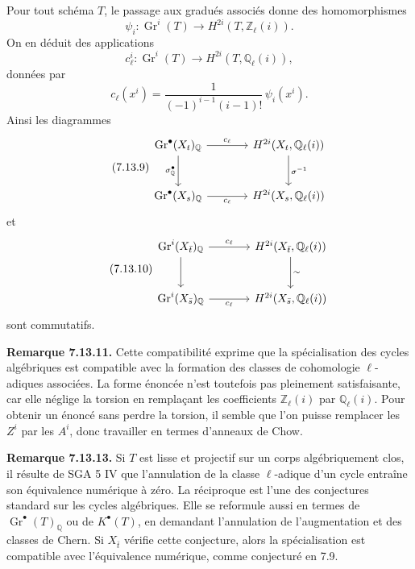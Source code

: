 \documentclass[11pt]{article}
\newcommand{\Gr}{\operatorname{Gr}}
\providecommand{\Gr}{\operatorname{Gr}}
\providecommand{\Gr}{\operatorname{G}}
\begin{document}
Pour tout schéma \(T\), le passage aux gradués associés donne des homomorphismes
\[
  \psi_i:\Gr^i(T)\longrightarrow H^{2i}(T,\mathbb Z_\ell(i)).
\]
On en déduit des applications
\begin{equation}\tag{7.13.7}
  c_\ell^i:\Gr^i(T)\longrightarrow H^{2i}(T,\mathbb Q_\ell(i)),
\end{equation}
données par
\begin{equation}\tag{7.13.8}
  c_\ell(x^i)=\frac{1}{(-1)^{i-1}(i-1)!}\,\psi_i(x^i).
\end{equation}
Ainsi les diagrammes
\begin{equation}\tag{7.13.9}
\begin{tikzcd}[column sep=large,row sep=large]
\Gr^\bullet(X_t)_{\mathbb Q} \arrow[r,"c_\ell"] \arrow[d,"\sigma_{\mathbb Q}^\bullet"'] &
H^{2i}(X_t,\mathbb Q_\ell(i)) \arrow[d,"\sigma^{-1}"]\\
\Gr^\bullet(X_s)_{\mathbb Q} \arrow[r,"c_\ell"'] &
H^{2i}(X_s,\mathbb Q_\ell(i))
\end{tikzcd}
\end{equation}
et
\begin{equation}\tag{7.13.10}
\begin{tikzcd}[column sep=large,row sep=large]
\Gr^i(X_{\bar t})_{\mathbb Q} \arrow[r,"c_\ell"] \arrow[d] &
H^{2i}(X_{\bar t},\mathbb Q_\ell(i)) \arrow[d,"\sim"]\\
\Gr^i(X_{\bar s})_{\mathbb Q} \arrow[r,"c_\ell"'] &
H^{2i}(X_{\bar s},\mathbb Q_\ell(i))
\end{tikzcd}
\end{equation}
sont commutatifs.

\textbf{Remarque 7.13.11.} Cette compatibilité exprime que la spécialisation des cycles algébriques est compatible avec la formation des classes de cohomologie \(\ell\)-adiques associées. La forme énoncée n'est toutefois pas pleinement satisfaisante, car elle néglige la torsion en remplaçant les coefficients \(\mathbb Z_\ell(i)\) par \(\mathbb Q_\ell(i)\). Pour obtenir un énoncé sans perdre la torsion, il semble que l'on puisse remplacer les \(Z^i\) par les \(A^i\), donc travailler en termes d'anneaux de Chow.

\textbf{Remarque 7.13.13.} Si \(T\) est lisse et projectif sur un corps algébriquement clos, il résulte de SGA 5 IV que l'annulation de la classe \(\ell\)-adique d'un cycle entraîne son équivalence numérique à zéro. La réciproque est l'une des conjectures standard sur les cycles algébriques. Elle se reformule aussi en termes de \(\Gr^\bullet(T)_{\mathbb Q}\) ou de \(K^\bullet(T)\), en demandant l'annulation de l'augmentation et des classes de Chern. Si \(X_{\bar t}\) vérifie cette conjecture, alors la spécialisation est compatible avec l'équivalence numérique, comme conjecturé en 7.9.
\end{document}
